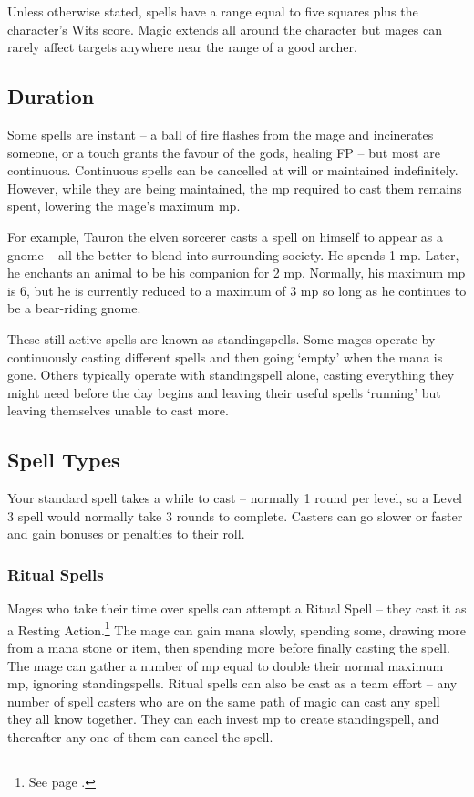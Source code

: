 \documentclass[titlepage,a4paper,openany]{book}
\begin{document}
\begin{multicols}{2}
Unless otherwise stated, spells have a range equal to five squares plus the character's Wits score. Magic extends all around the character but mages can rarely affect targets anywhere near the range of a good archer.

\subsection{Duration}

Some spells are instant -- a ball of fire flashes from the mage and incinerates someone, or a touch grants the favour of the gods, healing FP -- but most are continuous. Continuous spells can be cancelled at will or maintained indefinitely. However, while they are being maintained, the \gls{mp} required to cast them remains spent, lowering the mage's maximum \gls{mp}.

For example, Tauron the elven sorcerer casts a spell on himself to appear as a gnome -- all the better to blend into surrounding society. He spends 1 \gls{mp}. Later, he enchants an animal to be his companion for 2 \gls{mp}. Normally, his maximum \gls{mp} is 6, but he is currently reduced to a maximum of 3 \gls{mp} so long as he continues to be a bear-riding gnome.

These still-active spells are known as \glspl{standingspell}. Some mages operate by continuously casting different spells and then going `empty' when the mana is gone. Others typically operate with \gls{standingspell} alone, casting everything they might need before the day begins and leaving their useful spells `running' but leaving themselves unable to cast more.

\subsection{Spell Types}

Your standard spell takes a while to cast -- normally 1 \gls{round} per level, so a Level 3 spell would normally take 3 \glspl{round} to complete.  Casters can go slower or faster and gain bonuses or penalties to their roll.

\subsubsection{Ritual Spells}

Mages who take their time over spells can attempt a Ritual Spell -- they cast it as a Resting Action.\footnote{See page \pageref{restingactions}.} The mage can gain mana slowly, spending some, drawing more from a mana stone or item, then spending more before finally casting the spell. The mage can gather a number of \gls{mp} equal to double their normal maximum \gls{mp}, ignoring \glspl{standingspell}. Ritual spells can also be cast as a team effort -- any number of spell casters who are on the same \gls{path} of magic can cast any spell they all know together. They can each invest \gls{mp} to create \gls{standingspell}, and thereafter any one of them can cancel the spell.


\end{multicols}
\end{document}
